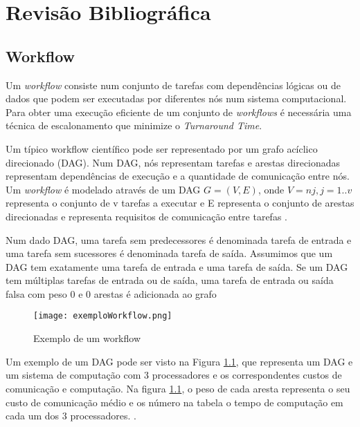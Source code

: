 \chapter{Revisão Bibliográfica} \label{chap:sota}



\section{Workflow}
Um \textit{workflow} consiste num conjunto de tarefas com dependências lógicas ou de dados que podem ser executadas por diferentes nós num sistema computacional. Para obter uma execução eficiente de um conjunto de \textit{workflows} é necessária uma técnica de escalonamento que minimize o \textit{Turnaround Time}.

Um típico workflow científico pode ser representado por um grafo acíclico direcionado (DAG). Num DAG, nós representam tarefas e arestas direcionadas representam dependências de execução e a quantidade de comunicação entre nós. Um \textit{workflow} é modelado através de um DAG $G = (V,E)$, onde $V = {nj, j = 1..v}$ representa o conjunto de v tarefas a executar e E representa o conjunto de arestas direcionadas e representa requisitos de comunicação entre tarefas \cite{Arabnejad}.

Num dado DAG, uma tarefa sem predecessores é denominada tarefa de entrada e uma tarefa sem sucessores é denominada tarefa de saída.
Assumimos que um DAG tem exatamente uma tarefa de entrada e uma tarefa de saída. Se um DAG tem múltiplas tarefas de entrada ou de saída, uma tarefa de entrada ou saída falsa com peso 0 e 0 arestas é adicionada ao grafo \cite{ArabnejadUP}

\begin{figure}[H]
	\centering
	\texttt{[image: exemploWorkflow.png]}
	\caption{Exemplo de um workflow}
	\label{workflow}
\end{figure}


Um exemplo de um DAG pode ser visto na Figura \ref{workflow}, que representa um DAG e um sistema de computação com 3 processadores e os correspondentes custos de comunicação e computação. Na figura \ref{workflow}, o peso de cada aresta representa o seu custo de comunicação médio e os número na tabela o tempo de computação em cada um dos 3 processadores. \cite{Arabnejad}. 


